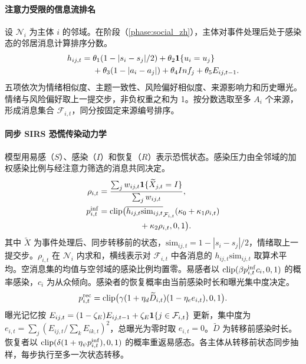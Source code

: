\paragraph{注意力受限的信息流排名} 设 $\mathcal N_i$ 为主体 $i$ 的邻域。在阶段（\ref{phase:social_zh}），主体对事件处理后处于感染态的邻居消息计算排序分数。
\begin{equation}
\begin{split}h_{ij,t}={}&\theta_1(1-|s_i-s_j|/2)+\theta_2\mathbf{1}\{u_i=u_j\}\\&+\theta_3(1-|a_i-a_j|)+\theta_4 Inf_j+\theta_5 E_{ij,t-1}.\end{split}
  \label{eq:message_score_zh}
\end{equation}
五项依次为情绪相似度、主题一致性、风险偏好相似度、来源影响力和历史曝光。情绪与风险偏好取上一提交步，非负权重之和为 1。按分数选取至多 $A_i$ 个来源，形成消息集合 $\mathcal F_{i,t}$，同分按固定来源编号排序。

\paragraph{同步 SIRS 恐慌传染动力学} 模型用易感（$S$）、感染（$I$）和恢复（$R$）表示恐慌状态。感染压力由全邻域的加权感染比例与经注意力筛选的消息共同决定。
\begin{equation}
\begin{split}\rho_{i,t}&=\frac{\sum_j w_{ij,t}\mathbf{1}\{\widetilde X_{j,t}=I\}}{\sum_jw_{ij,t}},\\p^{\rm inf}_{i,t}&=\operatorname{clip}\bigl(\overline{h_{ij,t}\mathrm{sim}_{ij,t}}_{\mathcal F_{i,t}}(\kappa_0+\kappa_1\rho_{i,t})\\&\hspace{5em}+\kappa_2\rho_{i,t},0,1\bigr).\end{split}
  \label{eq:infection_prob_zh}
\end{equation}
其中 $\widetilde X$ 为事件处理后、同步转移前的状态，$\mathrm{sim}_{ij,t}=1-|s_i-s_j|/2$，情绪取上一提交步。$\rho_{i,t}$ 在 $\mathcal N_i$ 内求和，横线表示对 $\mathcal F_{i,t}$ 中各消息的 $h_{ij,t}\mathrm{sim}_{ij,t}$ 取算术平均。空消息集的均值与空邻域的感染比例均置零。易感者以 $\operatorname{clip}(\beta p^{\rm inf}_{i,t}c_i,0,1)$ 的概率感染，$c_i$ 为从众倾向。感染者的恢复概率由当前感染时长和曝光集中度决定。
\begin{equation}
p^{\rm rec}_{i,t}=\operatorname{clip}\bigl(\gamma(1+\eta_d\widetilde D_{i,t})(1-\eta_e e_{i,t}),0,1\bigr).
  \label{eq:recovery_prob_zh}
\end{equation}
曝光记忆按 $E_{ij,t}=(1-\zeta_E)E_{ij,t-1}+\zeta_E\mathbf{1}\{j\in\mathcal F_{i,t}\}$ 更新，集中度为 $e_{i,t}=\sum_j(E_{ij,t}/\sum_k E_{ik,t})^2$，总曝光为零时取 $e_{i,t}=0$。$\widetilde D$ 为转移前感染时长。恢复者以 $\operatorname{clip}(\delta(1+\eta_\psi p^{\rm inf}_{i,t}),0,1)$ 的概率重返易感态。各主体从转移前状态同步抽样，每步执行至多一次状态转移。

